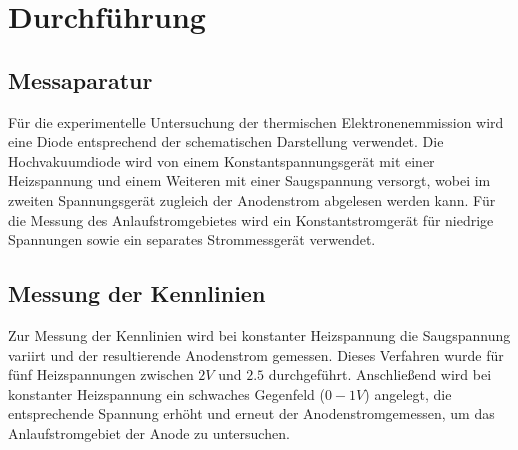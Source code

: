 \section{Durchführung}
\subsection{Messaparatur}
Für die experimentelle Untersuchung der thermischen Elektronenemmission wird eine Diode entsprechend der schematischen Darstellung verwendet. Die Hochvakuumdiode wird 
von einem Konstantspannungsgerät mit einer Heizspannung und einem Weiteren mit einer Saugspannung versorgt, wobei im zweiten Spannungsgerät zugleich der Anodenstrom
abgelesen werden kann. Für die Messung des Anlaufstromgebietes wird ein Konstantstromgerät für niedrige Spannungen sowie ein separates Strommessgerät verwendet.
\subsection{Messung der Kennlinien}
Zur Messung der Kennlinien wird bei konstanter Heizspannung die Saugspannung variirt und der resultierende Anodenstrom gemessen. Dieses Verfahren wurde für 
fünf Heizspannungen zwischen $2 V$ und $2.5$ durchgeführt. Anschließend wird bei konstanter Heizspannung ein schwaches Gegenfeld ($0-1 V$) angelegt, die entsprechende 
Spannung erhöht und erneut der Anodenstromgemessen, um das Anlaufstromgebiet der Anode zu untersuchen.
